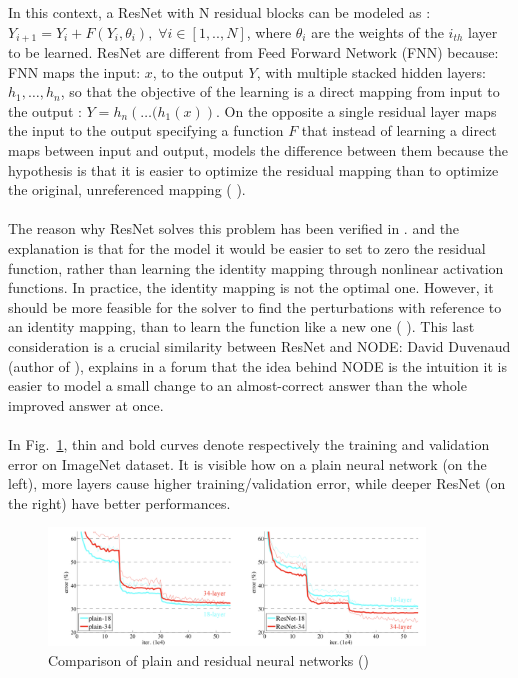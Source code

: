 \documentclass[LaM,binding=0.6cm]{sapthesis}
\begin{document}
In this context, a ResNet with N residual blocks can be modeled as : $Y_{i+1} = Y_{i} +F(Y_{i},\theta_{i}), \; \forall i \in [1,..,N]$, where $\theta_{i}$ are the weights of the $i_{th}$ layer to be learned. ResNet are different from Feed Forward Network (FNN) because: FNN maps the input: $x$, to the output $Y$, with multiple stacked hidden layers: $h_1, \dots, h_n$, so that the objective of the learning is a direct mapping from input to the output : $Y=h_n\left(\dots (h_1(x)\right)$. On the opposite a single residual layer maps the input to the output specifying a function $F$ that instead of learning a direct maps between input and output, models the difference between them because the hypothesis is that it is easier to optimize the residual mapping than to optimize the original, unreferenced mapping (\cite{DBLP:journals/corr/HeZRS15} ).\\\\The reason why ResNet solves this problem has been verified in \cite{DBLP:journals/corr/HeZRS15}. and the explanation is that for the model it would be easier to set to zero the residual function, rather than learning the identity mapping through nonlinear activation functions. In practice, the identity mapping is not the optimal one. However, it should be more feasible for the solver to find the perturbations with reference to an identity mapping, than to learn the function like a new one (\cite{DBLP:journals/corr/HeZRS15} ). This last consideration is a crucial similarity between ResNet and NODE: David Duvenaud (author of \cite{DBLP:journals/corr/abs-1806-07366}), explains in a forum that the idea behind NODE is the intuition it is easier to model a small change to an almost-correct answer than the whole improved answer at once.\\\\In Fig.~\ref{fig:degprob}, thin and bold curves denote respectively the training and validation error on ImageNet dataset. It is visible how on a plain neural network (on the left), more layers cause higher training/validation error, while deeper ResNet (on the right) have better performances.
\begin{figure}   \centering
    \includegraphics[width=100mm,scale=0.7]{degprob.png}
    \caption{Comparison of plain and residual neural networks (\cite{DBLP:journals/corr/HeZRS15})}
    \label{fig:degprob}
\end{figure}
\end{document}
